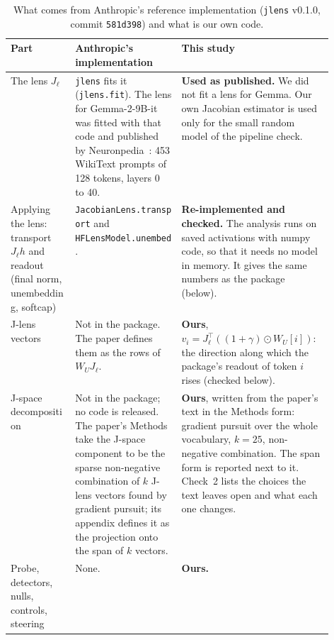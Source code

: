 \documentclass[11pt]{article}
\newcommand{\jlens}{\texttt{jlens}}
\begin{document}
\begin{table}[H]\centering\small
\begin{tabularx}{\linewidth}{@{}>{\raggedright\arraybackslash}p{0.2\linewidth}>{\raggedright\arraybackslash}p{0.33\linewidth}X@{}}\toprule
Part & Anthropic's implementation & This study\\\midrule
The lens $J_\ell$ & \jlens{} fits it (\texttt{jlens.fit}). The lens for Gemma-2-9B-it was fitted with that code and
published by Neuronpedia~\cite{neuronpedialens}: 453 WikiText prompts of 128 tokens, layers 0 to 40. &
\textbf{Used as published.} We did not fit a lens for Gemma. Our own Jacobian estimator is used only for the small random
model of the pipeline check.\\
Applying the lens: transport $J_\ell h$ and readout (final norm, unembedding, softcap) &
\texttt{JacobianLens.transport} and \texttt{HFLensModel.unembed}. &
\textbf{Re-implemented and checked.} The analysis runs on saved activations with numpy code, so that it needs no model in
memory. It gives the same numbers as the package (below).\\
J-lens vectors & Not in the package. The paper defines them as the rows of $W_U J_\ell$. &
\textbf{Ours}, $v_i = J_\ell^{\top}((1+\gamma)\odot W_U[i])$: the direction along which the package's readout of token $i$
rises (checked below).\\
J-space decomposition & Not in the package; no code is released. The paper's Methods take the J-space component to be the
sparse non-negative combination of $k$ J-lens vectors found by gradient pursuit; its appendix defines it as the projection
onto the span of $k$ vectors. &
\textbf{Ours}, written from the paper's text in the Methods form: gradient pursuit over the whole vocabulary, $k=25$,
non-negative combination. The span form is reported next to it. Check~2 lists the choices the text leaves open and what
each one changes.\\
Probe, detectors, nulls, controls, steering & None. & \textbf{Ours.}\\
\bottomrule\end{tabularx}
\caption{What comes from Anthropic's reference implementation (\jlens{} v0.1.0, commit \texttt{581d398}) and what is our
own code.}
\label{tab:impl}
\end{table}
\end{document}
